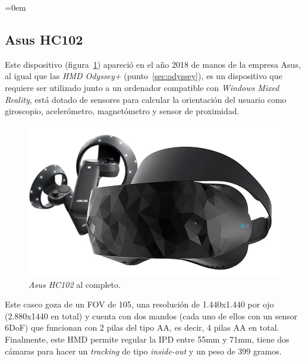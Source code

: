 \parindent=0em
\subsection{Asus HC102}
\noindent

Este dispositivo (figura~\ref{fig:asushc102}) apareció en el año 2018 de manos de la empresa Asus, al igual que las \textit{HMD Odyssey+} (punto~\ref{sec:odyssey}), es un dispositivo que requiere ser utilizado junto a un ordenador compatible con \textit{Windows Mixed Reality}, está dotado de sensores para calcular la orientación del usuario como giroscopio, acelerómetro, magnetómetro y sensor de proximidad.\\

\begin{figure}[H]
    \centering
    \includegraphics[scale=0.3]{Images/Estado del arte/AsusHC102.jpg}
    \caption[\textit{Asus HC102} al completo]{\textit{Asus HC102} al completo\footnotemark.}
    \label{fig:asushc102}
\end{figure}


Este casco goza de un FOV de 105\degree , una resolución de 1.440x1.440 por ojo (2.880x1440 en total) y cuenta con dos mandos (cada uno de ellos con un sensor 6DoF) que funcionan con 2 pilas del tipo AA, es decir, 4 pilas AA en total.\\

Finalmente, este HMD permite regular la IPD entre 55mm y 71mm, tiene dos cámaras para hacer un \textit{tracking} de tipo \textit{inside-out} y un peso de 399 gramos.